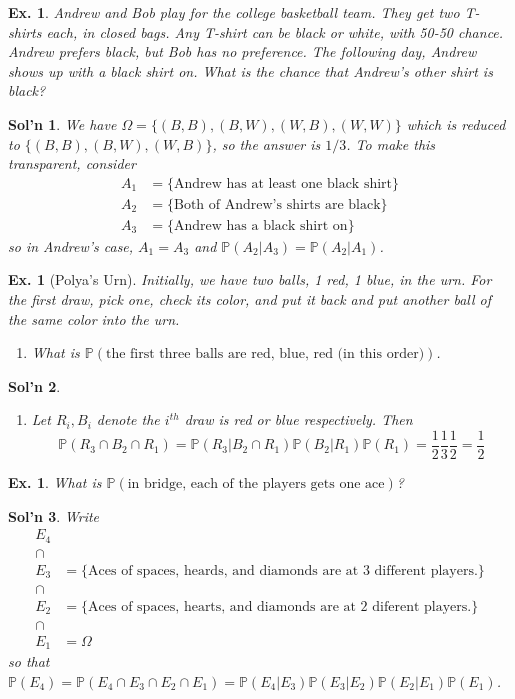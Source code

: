\documentclass[12pt, a4paper]{book}
\renewcommand{\Pr}{\mathbb{P}}
\newtheorem{example}[theorem]{Ex.}
\theoremstyle{nonumberplain}
\newtheorem{solution}{Sol'n}
\begin{document}
\begin{example}
    Andrew and Bob play for the college basketball team.
    They get two T-shirts each, in closed bags.
    Any T-shirt can be black or white, with 50-50 chance.
    Andrew prefers black, but Bob has no preference.
    The following day, Andrew shows up with a black shirt on.
    What is the chance that Andrew's other shirt is black?
\end{example}
\begin{solution}
    We have $\Omega=\{(B,B),(B,W),(W,B),(W,W)\}$ which is reduced to $\{(B,B),(B,W),(W,B)\}$, so the answer is $1/3$.
    To make this transparent, consider
    \begin{align*}
        A_1&=\{\text{Andrew has at least one black shirt}\}\\
        A_2&=\{\text{Both of Andrew's shirts are black}\}\\
        A_3&=\{\text{Andrew has a black shirt on}\}
    \end{align*}
    so in Andrew's case, $A_1=A_3$ and $\Pr(A_2|A_3)=\Pr(A_2|A_1)$.
\end{solution}
\begin{example}[Polya's Urn]
    Initially, we have two balls, 1 red, 1 blue, in the urn.
    For the first draw, pick one, check its color, and put it back and put another ball of the same color into the urn.
    \begin{enumerate}[nolistsep]
        \item What is $\Pr(\text{the first three balls are red, blue, red (in this order)})$.
    \end{enumerate}
\end{example}
\begin{solution}
    \begin{enumerate}
        \item Let $R_i,B_i$ denote the $i^{th}$ draw is red or blue respectively.
        Then
        \[\Pr(R_3\cap B_2\cap R_1)=\Pr(R_3|B_2\cap R_1)\Pr(B_2|R_1)\Pr(R_1)=\frac{1}{2}\frac{1}{3}\frac{1}{2}=\frac{1}{2}\]
    \end{enumerate}
\end{solution}
\begin{example}
    What is $\Pr(\text{in bridge, each of the players gets one ace})$?
\end{example}
\begin{solution}
    Write
    \begin{align*}
        E_4&\\
        \cap&\\
        E_3&=\{\text{Aces of spaces, heards, and diamonds are at 3 different players.}\}\\
        \cap&\\
        E_2&=\{\text{Aces of spaces, hearts, and diamonds are at 2 diferent players.}\}\\
        \cap&\\
        E_1&=\Omega
    \end{align*}
    so that $\Pr(E_4)=\Pr(E_4\cap E_3\cap E_2\cap E_1)=\Pr(E_4|E_3)\Pr(E_3|E_2)\Pr(E_2|E_1)\Pr(E_1)$.
\end{solution}
\end{document}
